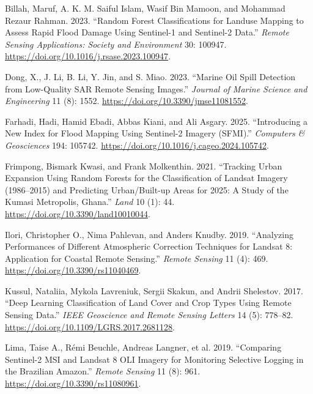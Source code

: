 \documentclass[
  letterpaper,
]{scrbook}
\newlength{\cslhangindent}
\newenvironment{CSLReferences}[2] %
 {\begin{list}{}{%
  \setlength{\itemindent}{0pt}
  \setlength{\leftmargin}{0pt}
  \setlength{\parsep}{0pt}
  \ifodd #1
   \setlength{\leftmargin}{\cslhangindent}
   \setlength{\itemindent}{-1\cslhangindent}
  \fi
  \setlength{\itemsep}{#2\baselineskip}}}
 {\end{list}}
\begin{document}
\label{refs}
\begin{CSLReferences}{1}{0}
Billah, Maruf, A. K. M. Saiful Islam, Wasif Bin Mamoon, and Mohammad
Rezaur Rahman. 2023. {``Random Forest Classifications for Landuse
Mapping to Assess Rapid Flood Damage Using {Sentinel-1} and {Sentinel-2}
Data.''} \emph{Remote Sensing Applications: Society and Environment} 30:
100947. \url{https://doi.org/10.1016/j.rsase.2023.100947}.

Dong, X., J. Li, B. Li, Y. Jin, and S. Miao. 2023. {``Marine Oil Spill
Detection from Low-Quality SAR Remote Sensing Images.''} \emph{Journal
of Marine Science and Engineering} 11 (8): 1552.
\url{https://doi.org/10.3390/jmse11081552}.

Farhadi, Hadi, Hamid Ebadi, Abbas Kiani, and Ali Asgary. 2025.
{``Introducing a New Index for Flood Mapping Using {Sentinel-2} Imagery
({SFMI}).''} \emph{Computers \& Geosciences} 194: 105742.
\url{https://doi.org/10.1016/j.cageo.2024.105742}.

Frimpong, Bismark Kwasi, and Frank Molkenthin. 2021. {``Tracking Urban
Expansion Using Random Forests for the Classification of Landsat Imagery
(1986--2015) and Predicting Urban/Built-up Areas for 2025: A Study of
the Kumasi Metropolis, Ghana.''} \emph{Land} 10 (1): 44.
\url{https://doi.org/10.3390/land10010044}.

Ilori, Christopher O., Nima Pahlevan, and Anders Knudby. 2019.
{``Analyzing Performances of Different Atmospheric Correction Techniques
for {Landsat} 8: Application for Coastal Remote Sensing.''} \emph{Remote
Sensing} 11 (4): 469. \url{https://doi.org/10.3390/rs11040469}.

Kussul, Nataliia, Mykola Lavreniuk, Sergii Skakun, and Andrii Shelestov.
2017. {``Deep Learning Classification of Land Cover and Crop Types Using
Remote Sensing Data.''} \emph{IEEE Geoscience and Remote Sensing
Letters} 14 (5): 778--82.
\url{https://doi.org/10.1109/LGRS.2017.2681128}.

Lima, Taise A., Rémi Beuchle, Andreas Langner, et al. 2019. {``Comparing
Sentinel-2 MSI and Landsat 8 OLI Imagery for Monitoring Selective
Logging in the Brazilian Amazon.''} \emph{Remote Sensing} 11 (8): 961.
\url{https://doi.org/10.3390/rs11080961}.


\end{CSLReferences}
\end{document}
